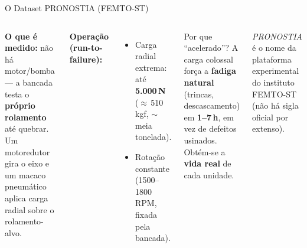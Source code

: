 \documentclass{beamer}
\begin{document}
\begin{frame}{O Dataset PRONOSTIA (FEMTO-ST)}
    \begin{columns}
        \footnotesize
        \textbf{O que é medido:} não há motor/bomba --- a bancada testa o \textbf{próprio rolamento} até quebrar. Um motoredutor gira o eixo e um macaco pneumático aplica carga radial sobre o rolamento-alvo.
        \vspace{0.15cm}

        \textbf{Operação (run-to-failure):}
        \begin{itemize}
            \item Carga radial extrema: até \textbf{5.000\,N} ($\approx$\,510\,kgf, $\sim$meia tonelada).
            \item Rotação constante (1500--1800\,RPM, fixada pela bancada).
        \end{itemize}
        \begin{block}{Por que ``acelerado''?}
            \footnotesize A carga colossal força a \textbf{fadiga natural} (trincas, descascamento) em \textbf{1--7\,h}, em vez de defeitos usinados. Obtém-se a \textbf{vida real} de cada unidade.
        \end{block}
        \footnotesize \textit{PRONOSTIA} é o nome da plataforma experimental do instituto FEMTO-ST (não há sigla oficial por extenso).
    \end{columns}
\end{frame}
\end{document}
